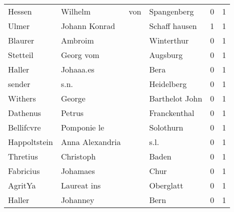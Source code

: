 \begin{center}
\begin{tiny}
\begin{longtabu}{llllrr}
                   Hessen &                            Wilhelm &         von &                                 Spangenberg &          0 &         1 \\
                    Ulmer &                      Johann Konrad &             &                               Schaff hausen &          1 &         1 \\
                  Blaurer &                            Ambroim &             &                                  Winterthur &          0 &         1 \\
                 Stetteil &                          Georg vom &             &                                    Augsburg &          0 &         1 \\
                   Haller &                          Johaaa.es &             &                                        Bera &          0 &         1 \\
                   sender &                               s.n. &             &                                  Heidelberg &          0 &         1 \\
                  Withers &                             George &             &                              Barthelot John &          0 &         1 \\
                 Dathenus &                             Petrus &             &                                Franckenthal &          0 &         1 \\
               Bellifcvre &                        Pomponie le &             &                                   Solothurn &          0 &         1 \\
             Happoltstein &                    Anna Alexandria &             &                                        s.l. &          0 &         1 \\
                 Thretius &                          Christoph &             &                                       Baden &          0 &         1 \\
                Fabricius &                           Johamaes &             &                                        Chur &          0 &         1 \\
                  AgritYa &                        Laureat ins &             &                                   Oberglatt &          0 &         1 \\
                   Haller &                           Johanney &             &                                        Bern &          0 &         1 \\

\end{longtabu}
\end{tiny}
\end{center}
